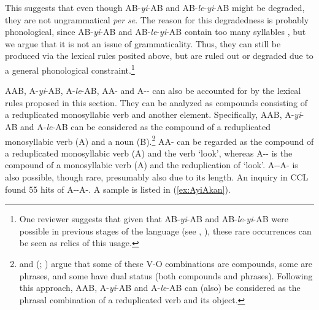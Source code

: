 This suggests that  even though AB-\textit{yi}-AB and AB-\textit{le}-\textit{yi}-AB might be degraded, they are not ungrammatical \textit{per se}.
The reason for this degradedness is probably phonological, since AB-\textit{yi}-AB and AB-\textit{le}-\textit{yi}-AB contain too many syllables \citetext{\citealp[274]{Fan1964}; \citealp[15]{Zhang2000}; \citealp[239]{YangWei2017}; \citealp[143]{Sui2018}}, but we argue that it is not an issue of grammaticality.
Thus, they can still be produced via the lexical rules posited above, but are ruled out or degraded due to a general phonological constraint.\footnote{
One reviewer suggests that given that AB-\textit{yi}-AB and AB-\textit{le}-\textit{yi}-AB were possible in previous stages of the language (see \citealt[15]{Zhang2000}, \citealt[160--161]{BascianoMelloni2017}),
these rare occurrences can be seen as relics of this usage.
}


AAB, A-\textit{yi}-AB, A-\textit{le}-AB, AA- and A-- can also be accounted for by the lexical rules proposed in this section.
They can be analyzed as compounds consisting of a reduplicated monosyllabic verb and another element.
Specifically, AAB, A-\textit{yi}-AB and A-\textit{le}-AB can be considered as the compound of a reduplicated monosyllabic verb (A) and a noun (B).\footnote{
    \citet[64--65]{Huang1984} and \citeauthor{Her1996} (\citeyear[Sec.\,2]{Her1996}; \citeyear[Sec.\,3.1]{Her2010}) argue that some of these V-O combinations are compounds, some are phrases, and some have dual status (both compounds and phrases).
    Following this approach, AAB, A-\textit{yi}-AB and A-\textit{le}-AB can (also) be considered as the phrasal combination of a reduplicated verb and its object.
}
AA- can be regarded as the compound of a reduplicated monosyllabic verb (A) and the verb  `look',
whereas A-- is the compound of a monosyllabic verb (A) and the reduplication of  `look'.
A--A- is also possible, though rare, presumably also due to its length.
An inquiry in CCL found 55 hits of A--A-.
A sample is listed in (\ref{ex:AyiAkan}).

